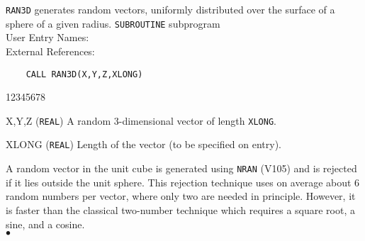                               
                              
\Submitter{}                                   
\begin{center}
\end{center}
{\tt RAN3D} generates random vectors, uniformly distributed over the
surface of a sphere of a given radius.
\Structure
{\tt SUBROUTINE} subprogram \\
User Entry Names:  \\
External References: 
\Usage
\begin{verbatim}
    CALL RAN3D(X,Y,Z,XLONG)
\end{verbatim}
\begin{DLtt}{12345678}
\item[X,Y,Z] ({\tt REAL}) A random 3-dimensional vector of length
{\tt XLONG}.
\item[XLONG] ({\tt REAL}) Length of the vector (to be specified on
entry).
\end{DLtt}
\Method
A random vector in the unit cube is generated using {\tt NRAN} (V105)
and is rejected if it lies outside the unit sphere. This rejection
technique uses on average about 6 random numbers per vector, where only
two are needed in principle. However, it is faster than the classical
two-number technique which requires a square root, a sine, and a cosine.
\\ $\bullet$
